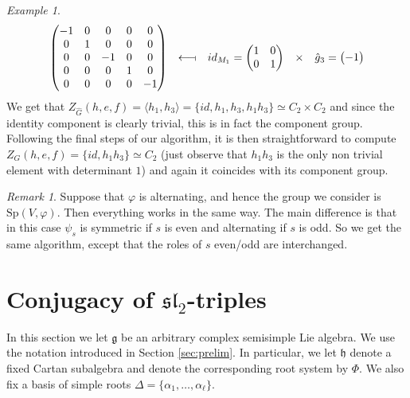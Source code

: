 \documentclass[a4paper,10pt]{amsart}
\newcommand{\testleftlong}{\longleftarrow\!\shortmid}
\newcommand{\Sp}{\mathrm{Sp}}
\newcommand{\mf}{\mathfrak}
\newcommand{\g}{\mf{g}}
\newcommand{\h}{\mf{h}}
\newcommand{\ssl}{\mf{sl}}
\renewcommand{\Sp}{\mathrm{Sp}}
\numberwithin{equation}{section}
\theoremstyle{remark}
\theoremstyle{remark}
\newtheorem{rmk}[theorem]{Remark}
\newtheorem{example}[theorem]{Example}
\begin{document}
\begin{example}
$$\begin{matrix}
\begin{pmatrix}
        -1 & 0 & 0 & 0 & 0\\
        0 & 1 & 0 & 0 & 0\\
        0 & 0 & -1 & 0 & 0\\
        0 & 0 & 0 & 1 & 0\\
        0 & 0 & 0 & 0 & -1\\
        \end{pmatrix} & \testleftlong & id_{M_1}=\begin{pmatrix}
            1 & 0\\
            0 & 1
        \end{pmatrix} & \times & \hat{g}_3=\begin{pmatrix}
            -1
        \end{pmatrix}\\
        
    \end{matrix}
$$
We get that $Z_{\hat{G}}(h,e,f)=\langle h_1,h_3\rangle=\{id,h_1,h_3,h_1h_3\}\simeq C_2\times C_2$ and since the identity component is clearly trivial, this is in fact the component group. Following the final steps of our algorithm, it is then straightforward to compute $Z_{G}(h,e,f)=\{id, h_1h_3\}\simeq C_2$ (just observe that $h_1h_3$ is the only non trivial element with determinant $1$) and again it coincides with its component group.
\end{example}

\begin{rmk}\label{rem:Cl}
Suppose that $\varphi$ is alternating, and hence the group we consider is
$\Sp(V,\varphi)$. Then everything works in the same way. The main difference
is that in this case $\psi_s$ is symmetric if $s$ is even and alternating if
$s$ is odd. So we get the same algorithm, except that the roles of $s$ even/odd
are interchanged.
\end{rmk}





\section{Conjugacy of $\ssl_2$-triples}\label{sec:conj}

In this section we let $\g$ be an arbitrary complex semisimple Lie algebra.
We use the notation introduced in Section \ref{sec:prelim}. In particular,
we let $\h$ denote a fixed Cartan subalgebra and denote the corresponding
root system by $\Phi$. We also fix a basis of simple roots $\Delta = \{
\alpha_1,\ldots,\alpha_\ell\}$. 
\end{document}
